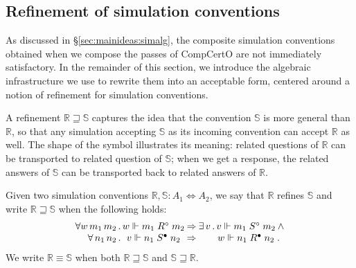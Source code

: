 \documentclass[acmsmall,screen,review,anonymous]{acmart}
\newcommand{\que}{\circ}
\newcommand{\ans}{\bullet}
\newcommand{\scref}{\sqsupseteq}
\begin{document}

\subsection{Refinement of simulation conventions} \label{sec:scref} %

As discussed in \S\ref{sec:mainideas:simalg},
the composite simulation conventions obtained
when we compose the passes of CompCertO
are not immediately satisfactory.
In the remainder of this section,
we introduce the algebraic infrastructure we use
to rewrite them into an acceptable form,
centered around
a notion of refinement for simulation conventions.

A refinement $\mathbb{R} \scref \mathbb{S}$
captures the idea that the convention $\mathbb{S}$
is more general than $\mathbb{R}$,
so that any simulation accepting $\mathbb{S}$ as its
incoming convention can accept $\mathbb{R}$ as well.
The shape of the symbol illustrates its meaning:
related questions of $\mathbb{R}$ can be transported to
related question of $\mathbb{S}$;
when we get a response, the
related answers of $\mathbb{S}$ can be transported back to
related answers of $\mathbb{R}$.

\begin{definition} %
Given two simulation conventions
$\mathbb{R}, \mathbb{S} : A_1 \Leftrightarrow A_2$,
we say that
$\mathbb{R}$ refines $\mathbb{S}$ and write
$\mathbb{R} \scref \mathbb{S}$
when the following holds:
\[
    \begin{array}{r@{}c@{\:\Rightarrow\:}c@{}c@{}l}
      \forall w \, m_1 \, m_2 \,.\, &
      w \Vdash m_1 \mathrel{R^\que} m_2 &
      \exists \, v \,.\, &
      v \Vdash m_1 \mathrel{S^\que} m_2 &
      \: \wedge \\
      \forall \, n_1 \, n_2 \,.\, &
      v \Vdash n_1 \mathrel{S^\ans} n_2 &
      &
      w \Vdash n_1 \mathrel{R^\ans} n_2 & \,.
    \end{array}
\]
We write $\mathbb{R} \equiv \mathbb{S}$ when both
$\mathbb{R} \scref \mathbb{S}$ and
$\mathbb{S} \scref \mathbb{R}$.
\end{definition}
\end{document}
